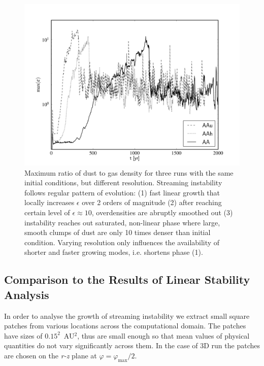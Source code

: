 \begin{figure}
   \includegraphics[width=0.98\linewidth]{figures/fig4}
   \caption{Maximum ratio of dust to gas density for three runs with the same
      initial conditions, but different resolution. Streaming instability
      follows regular pattern of evolution: (1) fast linear growth that locally
      increases $\epsilon$ over 2 orders of magnitude (2) after reaching certain
      level of $\epsilon \approx 10$, overdensities are abruptly smoothed out
      (3) instability reaches out saturated, non-linear phase where large,
      smooth clumps of dust are only 10 times denser than initial condition.
      Varying resolution only influences the availability of shorter and faster
      growing modes, i.e. shortens phase (1).  }
   \label{fig4}
\end{figure}
%

\subsection{Comparison to the Results of Linear Stability Analysis}
In order to analyse the growth of streaming instability we extract small square
patches from various locations across the computational domain. The patches have
sizes of $0.15^2$~AU$^2$, thus are small enough so that mean values of physical
quantities do not vary significantly across them. In the case of 3D run the
patches are chosen on the {\it r-z} plane at $\varphi = \varphi_\textrm{max} /
2$. 

